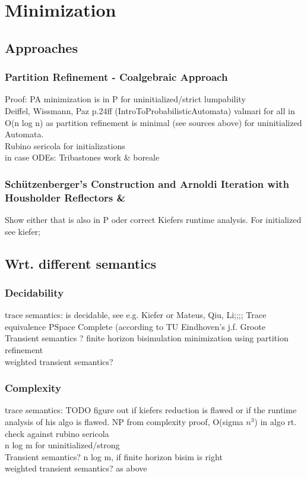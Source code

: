             
     
    \section{Minimization}
        \subsection{Approaches}
            \subsubsection{Partition Refinement - Coalgebraic Approach}
            Proof: PA minimization is in P for uninitialized/strict lumpability \\
            Deiffel, Wissmann, Paz p.24ff (IntroToProbabilisticAutomata) valmari
            for all in O(n log n) as partition refinement is minimal (see sources above) for uninitialized Automata. \\
            Rubino sericola for initializations \\
            in case ODEs: Tribastones work \& boreale
        
            \subsubsection{Schützenberger's Construction and Arnoldi Iteration with Housholder Reflectors \& }
            Show either that is also in P oder correct Kiefers runtime analysis.
            For initialized see kiefer; 
            
        \subsection{Wrt. different semantics}
            \subsubsection{Decidability}
            trace semantics: is decidable, see e.g. Kiefer or Mateus, Qiu, Li;;;; Trace equivalence PSpace Complete (according to TU Eindhoven's j.f. Groote \\
            Transient semantics ? finite horizon bisimulation minimization using partition refinement \\
            weighted transient semantics? \\
            
            \subsubsection{Complexity}
            trace semantics: TODO figure out if kiefers reduction is flawed or if the runtime analysis of his algo is flawed. NP from complexity proof, O(sigma $n^3$) in algo rt. check against rubino sericola \\ 
            n log m for uninitialized/strong\\
            Transient semantics? n log m, if finite horizon bisim is right\\
            weighted transient semantics? as above \\
            
    
